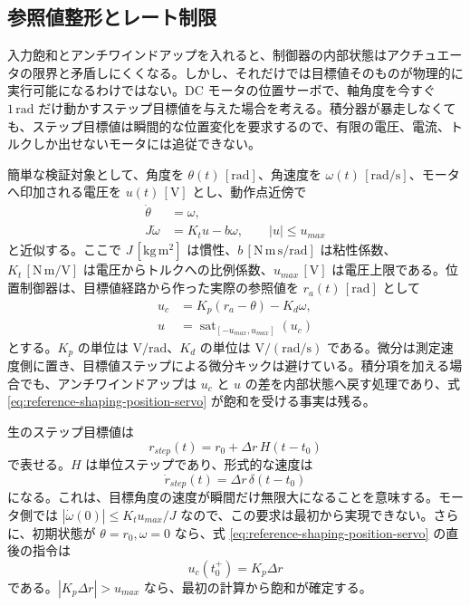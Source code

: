 \subsection{参照値整形とレート制限}

入力飽和とアンチワインドアップを入れると、制御器の内部状態はアクチュエータの限界と矛盾しにくくなる。しかし、それだけでは目標値そのものが物理的に実行可能になるわけではない。DC モータの位置サーボで、軸角度を今すぐ $1\,\mathrm{rad}$ だけ動かすステップ目標値を与えた場合を考える。積分器が暴走しなくても、ステップ目標値は瞬間的な位置変化を要求するので、有限の電圧、電流、トルクしか出せないモータには追従できない。

簡単な検証対象として、角度を $\theta(t)\,[\mathrm{rad}]$、角速度を $\omega(t)\,[\mathrm{rad/s}]$、モータへ印加される電圧を $u(t)\,[\mathrm{V}]$ とし、動作点近傍で
\begin{align}
  \dot{\theta}&=\omega,\\
  J\dot{\omega}&=K_tu-b\omega,
  \qquad |u|\leq u_{max}
  \label{eq:reference-shaping-motor-model}
\end{align}
と近似する。ここで $J\,[\mathrm{kg\,m^2}]$ は慣性、$b\,[\mathrm{N\,m\,s/rad}]$ は粘性係数、$K_t\,[\mathrm{N\,m/V}]$ は電圧からトルクへの比例係数、$u_{max}\,[\mathrm{V}]$ は電圧上限である。位置制御器は、目標値経路から作った実際の参照値を $r_a(t)\,[\mathrm{rad}]$ として
\begin{align}
  u_c&=K_p(r_a-\theta)-K_d\omega,\\
  u&=\operatorname{sat}_{[-u_{max},u_{max}]}(u_c)
  \label{eq:reference-shaping-position-servo}
\end{align}
とする。$K_p$ の単位は $\mathrm{V/rad}$、$K_d$ の単位は $\mathrm{V/(rad/s)}$ である。微分は測定速度側に置き、目標値ステップによる微分キックは避けている。積分項を加える場合でも、アンチワインドアップは $u_c$ と $u$ の差を内部状態へ戻す処理であり、式 \eqref{eq:reference-shaping-position-servo} が飽和を受ける事実は残る。

生のステップ目標値は
\begin{equation}
  r_{step}(t)=r_0+\Delta r\,H(t-t_0)
\end{equation}
で表せる。$H$ は単位ステップであり、形式的な速度は
\begin{equation}
  \dot{r}_{step}(t)=\Delta r\,\delta(t-t_0)
\end{equation}
になる。これは、目標角度の速度が瞬間だけ無限大になることを意味する。モータ側では $|\dot{\omega}(0)|\leq K_tu_{max}/J$ なので、この要求は最初から実現できない。さらに、初期状態が $\theta=r_0,\omega=0$ なら、式 \eqref{eq:reference-shaping-position-servo} の直後の指令は
\begin{equation}
  u_c(t_0^+)=K_p\Delta r
\end{equation}
である。$|K_p\Delta r|>u_{max}$ なら、最初の計算から飽和が確定する。


